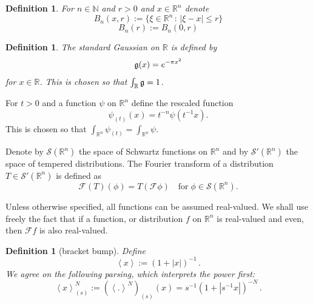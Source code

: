 \documentclass[12pt,reqno]{amsart}
\theoremstyle{plain}
\newtheorem{definition}[theorem]{Definition}
\numberwithin{equation}{section}
\theoremstyle{remark}
\newcommand{\R}{{\mathbb R}}
\newcommand{\N}{{\mathbb N}}
\begin{document}
\begin{definition}\label{closed ball}
    For $n\in\N$ and $r>0$ and $x\in \R^n$ denote
\begin{equation}\label{auto:closed-ball-definition} B_n(x,r) := \{ \xi\in\mathbb{R}^n\,:\, |\xi-x|\le r \} \end{equation}
\begin{equation}\label{auto:centered-closed-ball-definition} B_n(r) := B_n(0,r) \end{equation}

\end{definition}


\begin{definition}\label{gaussian}
The standard Gaussian on $\R$ is defined by
\begin{equation}\label{standard Gaussian formula}
\mathfrak{g}(x)=e^{-\pi x^2}
\end{equation}
for $x\in\R$. This is chosen so that $\int_{\R}\g=1$.
\end{definition}


For $t>0$ and a function $\psi$ on $\R^n$ define the rescaled function
\begin{equation}\label{auto:L1-normalized-dilation}
\psi_{(t)}(x)=t^{-n} \psi(t^{-1}x).
\end{equation}
This is chosen so that $\int_{\R^n} \psi_{(t)} = \int_{\R^n} \psi$.

Denote by $\mathcal{S}(\R^n)$ the space of Schwartz functions on $\R^n$ and by $\mathcal{S}'(\R^n)$ the space of tempered distributions. The Fourier transform of a distribution $T\in\mathcal{S}'(\R^n)$ is defined as
\begin{equation}\label{auto:Fourier-transform-of-distribution} \mathcal{F}(T)(\phi) = T(\mathcal{F}\phi)\quad\text{for}\;\phi\in\mathcal{S}(\R^n). \end{equation}

Unless otherwise specified, all functions can be assumed real-valued.
We shall use freely the fact that if a function, or distribution $f$ on $\R^n$ is real-valued and even, then $\mathcal{F} f$ is also real-valued.


\begin{definition}[bracket bump]\label{bracket bump}
Define
\begin{equation}\label{auto:bracket-weight-definition}
    \left<x\right>:=(1+|x|)^{-1}\, .
\end{equation}
We agree on the following parsing, which interprets the power first:
\begin{equation}\label{auto:scaled-bracket-weight}
    \left<x\right>^N_{(s)}:=(\left< .\right>^N)_{(s)}(x)=s^{-1}(1+|s^{-1}x|)^{-N}\, .
\end{equation}
\end{definition}
\end{document}
